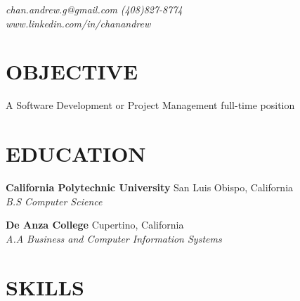 \documentclass[margin,line]{resume}
\begin{document}
\fontsize{9.5pt}{9.5pt}\selectfont
\def \identsize {12mm}

{
  \sc
    \hfill {\infosize\textsl{chan.andrew.g@gmail.com}} \hspace{20mm} {\infosize\textsl{(408)827-8774}}                    \\\vspace{0mm}
    \hfill {\infosize\textsl{www.linkedin.com/in/chanandrew}}   \\\vspace{-10mm}
}

\begin{resume}

\vspace{1mm}

    \section{\mysidestyle \textbf{\large{O}\small{BJECTIVE}}}

    A Software Development or Project Management full-time position

\sectionline

    \section{\mysidestyle \textbf{\large{E}\small{DUCATION}}}

    \textbf{\listing California Polytechnic University} \hfill San Luis Obispo, California\\
    \hspace*{\identsize} \textsl{B.S Computer Science} \vspace{-2.5mm}
    
    \textbf{\listing De Anza College} \hfill Cupertino, California\\
    \hspace*{\identsize} \textsl{A.A Business and Computer Information Systems}

\sectionline

    \section{\mysidestyle \textbf{\large{S}\small{KILLS}}}


\end{resume}
\end{document}
